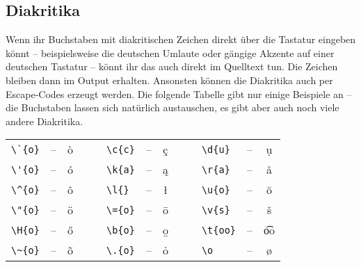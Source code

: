 \subsection{Diakritika}
Wenn ihr Buchstaben mit diakritischen Zeichen direkt über die Tastatur eingeben könnt – beispielsweise die deutschen Umlaute oder gängige Akzente auf einer deutschen Tastatur – könnt ihr das auch direkt im Quelltext tun.
Die Zeichen bleiben dann im Output erhalten.
Ansonsten können die Diakritika auch per Escape-Codes erzeugt werden.
Die folgende Tabelle gibt nur einige Beispiele an – die Buchstaben lassen sich natürlich austauschen, es gibt aber auch noch viele andere Diakritika.
\begin{center}
	\begin{longtable}{lccclccclcc}
		\toprule
			\verb|\`{o}| & -- & \`{o} & $\quad$ & \verb|\c{c}| & -- & \c{c} & $\quad$ & \verb|\d{u}| & -- & \d{u} \\
			\verb|\'{o}| & -- & \'{o} & & \verb|\k{a}| & -- & \k{a} & & \verb|\r{a}| & -- & \r{a} \\
			\verb|\^{o}| & -- & \^{o} & & \verb|\l{}| & -- & \l{} & & \verb|\u{o}| & -- & \u{o} \\
			\verb|\"{o}| & -- & \"{o} & & \verb|\={o}| & -- & \={o} & & \verb|\v{s}| & -- & \v{s} \\
			\verb|\H{o}| & -- & \H{o} & & \verb|\b{o}| & -- & \b{o} & & \verb|\t{oo}| & -- & \t{oo} \\
			\verb|\~{o}| & -- & \~{o} & & \verb|\.{o}| & -- & \.{o} & & \verb|\o| & -- & \o \\
		\bottomrule
	\end{longtable}
\end{center}

